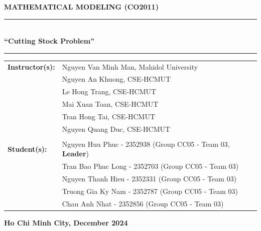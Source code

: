 \documentclass[a4paper]{article}
\begin{document}
\begin{titlepage}
\begin{center}
        \vspace{1cm}
        {\LARGE \textbf{MATHEMATICAL MODELING (CO2011)}}\\
        \vspace{1cm}
        \hrule
        \vspace{1cm}
        {\Large {}} \\
        \vspace{1cm}
        {\Huge \textbf{“Cutting Stock Problem”}}\\
        \vspace{1cm}
        \hrule
        \vspace{1cm}
\begin{center} %
\begin{tabular}{@{}p{4cm}p{10cm}p{14cm}@{}}
    \textbf{Instructor(s):} & Nguyen Van Minh Man, Mahidol University \\
                            & Nguyen An Khuong, CSE-HCMUT \\
                            & Le Hong Trang, CSE-HCMUT \\
                            & Mai Xuan Toan, CSE-HCMUT \\
                            & Tran Hong Tai, CSE-HCMUT \\
                            & Nguyen Quang Duc, CSE-HCMUT \\
    \\
    \textbf{Student(s):}    & Nguyen Huu Phuc - 2352938 (Group CC05 - Team 03, \textbf{Leader}) \\
                            & Tran Bao Phuc Long - 2352703 (Group CC05 - Team 03) \\
                            & Nguyen Thanh Hieu - 2352331 (Group CC05 - Team 03) \\
                            & Truong Gia Ky Nam - 2352787 (Group CC05 - Team 03) \\
                            & Chau Anh Nhat - 2352856 (Group CC05 - Team 03)\\
\end{tabular}
\end{center}
\vspace{1cm}

        \vfill

        \textbf{\Large Ho Chi Minh City, December 2024}
    \end{center}
\end{titlepage}
\end{document}
